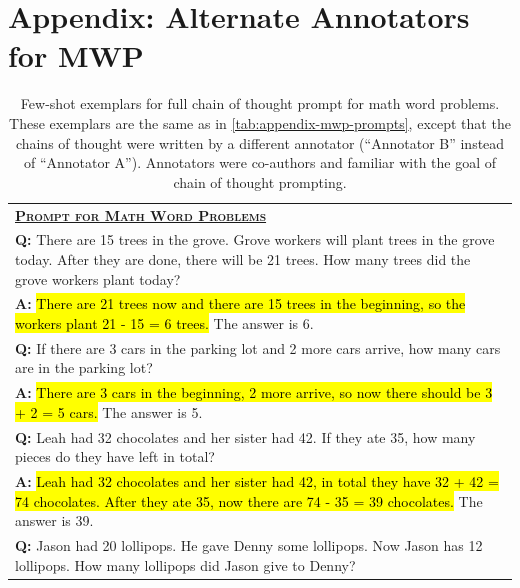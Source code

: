 \documentclass[]{article}
\theoremstyle{plain}
\theoremstyle{definition}
\theoremstyle{remark}
\begin{document}
\section{Appendix: Alternate Annotators for MWP}\label{sec:appendix-alternate-annotators}
\begingroup
\begin{table}[H]
    \centering
    \small
    \caption{
    Few-shot exemplars for full chain of thought prompt for math word problems. These exemplars are the same as in \cref{tab:appendix-mwp-prompts}, except that the chains of thought were written by a different annotator (``Annotator B'' instead of ``Annotator A'').
    Annotators were co-authors and familiar with the goal of chain of thought prompting.
    }
    \begin{tabular}{p{\linewidth}}
        \toprule
        \underline{\textbf{\textsc{Prompt for Math Word Problems}}} \\
        \vspace{-2mm}
        \textbf{Q:} There are 15 trees in the grove. Grove workers will plant trees in the grove today. After they are done, there will be 21 trees. How many trees did the grove workers plant today? \\
        \vspace{-1mm}
        \textbf{A:} \hl{There are 21 trees now and there are 15 trees in the beginning, so the workers plant 21 - 15 = 6 trees.} The answer is 6. \\
        \vspace{0mm}
        \textbf{Q:} If there are 3 cars in the parking lot and 2 more cars arrive, how many cars are in the parking lot? \\
        \vspace{-1mm}
        \textbf{A:} \hl{ There are 3 cars in the beginning, 2 more arrive, so now there should be 3 + 2 = 5 cars.}  The answer is 5. \\
        \vspace{0mm}
        \textbf{Q:} Leah had 32 chocolates and her sister had 42. If they ate 35, how many pieces do they have left in total? \\
        \vspace{-1mm}
        \textbf{A:} \hl{Leah had 32 chocolates and her sister had 42, in total they have 32 + 42 = 74 chocolates. After they ate 35, now there are 74 - 35 = 39 chocolates.} The answer is 39. \\
        \vspace{0mm}
        \textbf{Q:} Jason had 20 lollipops. He gave Denny some lollipops. Now Jason has 12 lollipops. How many lollipops did Jason give to Denny? \\

\end{tabular}
\end{table}
\end{document}
